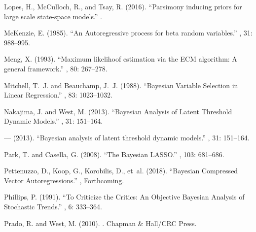 \documentclass[ba]{imsart}
\numberwithin{equation}{section}
\theoremstyle{plain}
\begin{document}
\begin{thebibliography}{70}
Lopes, H., McCulloch, R., and Tsay, R. (2016).
\newblock \enquote{Parsimony inducing priors for large scale state-space
  models.}
.
\endbibitem

McKenzie, E. (1985).
\newblock \enquote{An Autoregressive process for beta random variables.}
, 31: 988--995.
\endbibitem

Meng, X. (1993).
\newblock \enquote{Maximum likelihoof estimation via the {ECM} algorithm: A
  general framework.}
, 80: 267--278.
\endbibitem

Mitchell, T.~J. and Beauchamp, J.~J. (1988).
\newblock \enquote{{B}ayesian Variable Selection in Linear Regression.}
, 83:
  1023--1032.
\endbibitem

Nakajima, J. and West, M. (2013{}).
\newblock \enquote{Bayesian Analysis of Latent Threshold Dynamic Models.}
, 31: 151--164.
\endbibitem

--- (2013{}).
\newblock \enquote{Bayesian analysis of latent threshold dynamic models.}
, 31: 151--164.
\endbibitem

Park, T. and Casella, G. (2008).
\newblock \enquote{The {B}ayesian {LASSO}.}
, 103:
  681--686.
\endbibitem

Pettenuzzo, D., Koop, G., Korobilis, D., et~al. (2018).
\newblock \enquote{Bayesian Compressed Vector Autoregressions.}
, Forthcoming.
\endbibitem

Phillips, P. (1991).
\newblock \enquote{To Criticize the Critics: {A}n Objective {B}ayesian Analysis
  of Stochastic Trends.}
, 6: 333--364.
\endbibitem

Prado, R. and West, M. (2010).
.
\newblock Chapman \& Hall/CRC Press.
\endbibitem


\end{thebibliography}
\end{document}

